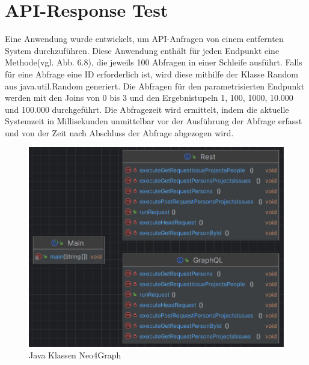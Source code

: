 \section{API-Response Test} %
\label{sec:test}
Eine Anwendung wurde entwickelt, um API-Anfragen von einem entfernten System durchzuführen. Diese Anwendung enthält für jeden Endpunkt eine Methode(vgl. Abb. 6.8), die jeweils 100 Abfragen in einer Schleife ausführt. Falls für eine Abfrage eine ID erforderlich ist, wird diese mithilfe der Klasse Random aus java.util.Random generiert. Die Abfragen für den parametrisierten Endpunkt werden mit den Joins von 0 bis 3 und den Ergebnistupeln 1, 100, 1000, 10.000 und 100.000 durchgeführt. Die Abfragezeit wird ermittelt, indem die aktuelle Systemzeit in Millisekunden unmittelbar vor der Ausführung der Abfrage erfasst und von der Zeit nach Abschluss der Abfrage abgezogen wird.
\begin{figure}[H]
	\centering
	\includegraphics[scale=0.5]{Illustrations/apiresponsetest.png}
	\caption{Java Klassen Neo4Graph}
\end{figure}
